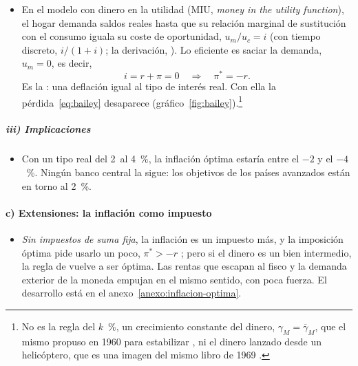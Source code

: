 \documentclass[11pt]{article}
\begin{document}
\begin{itemize}
\item En el modelo con dinero en la utilidad (MIU, \emph{money in the utility function})\nocite{Sidrauski1967Rational}, el hogar demanda saldos reales hasta que su relación marginal de sustitución con el consumo iguala su coste de oportunidad, $u_m/u_c=i$ (con tiempo discreto, $i/(1+i)$; la derivación, ). Lo eficiente es saciar la demanda, $u_m=0$, es decir,
  \begin{equation}\label{eq:regla-friedman}
  i=r+\pi=0\quad\Longrightarrow\quad\pi^*=-r .
  \end{equation}
  Es la : una deflación igual al tipo de interés real. Con ella la pérdida~\eqref{eq:bailey} desaparece (gráfico~\ref{fig:bailey}).\footnote{No es la regla del $k$~\%, un crecimiento constante del dinero, $\gamma_M=\overline\gamma_M$, que el mismo  propuso en 1960 para estabilizar , ni el dinero lanzado desde un helicóptero, que es una imagen del mismo libro de 1969 .}
\end{itemize}

\subparagraph{iii) Implicaciones}

\begin{itemize}
\item Con un tipo real del 2~al 4~\%, la inflación óptima estaría entre el $-2$ y el $-4$~\%\nocite{SchmittGroheUribe2010Optimal}. Ningún banco central la sigue: los objetivos de los países avanzados están en torno al 2~\%.
\end{itemize}

\paragraph{c) Extensiones: la inflación como impuesto}

\begin{itemize}
\item \emph{Sin impuestos de suma fija}, la inflación es un impuesto más, y la imposición óptima pide usarlo un poco, $\pi^*>-r$\nocite{Phelps1973Inflation} ; pero si el dinero es un bien intermedio, la regla de  vuelve a ser óptima\nocite{ChariChristianoKehoe1996Optimality}. Las rentas que escapan al fisco y la demanda exterior de la moneda empujan en el mismo sentido, con poca fuerza. El desarrollo está en el anexo~\ref{anexo:inflacion-optima}.
\end{itemize}
\end{document}

